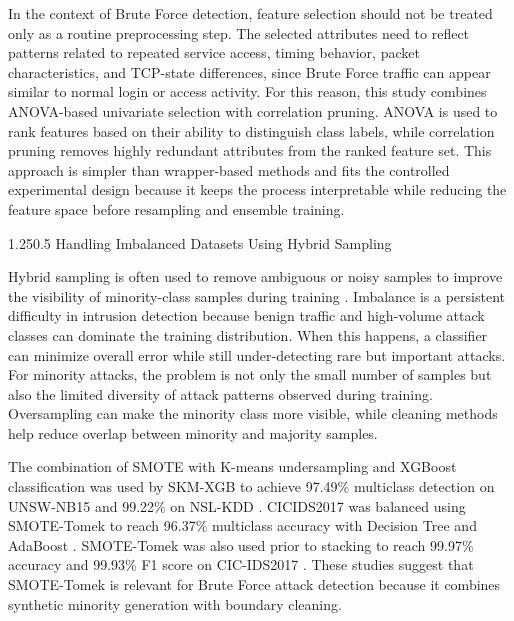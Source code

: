 \documentclass[12pt,a4paper]{article}
\makeatletter
\renewcommand{\subsection}{\@startsection{subsection}{2}{0pt}%
  {1.25\baselineskip}{0.5\baselineskip}%
  {\normalfont\fontsize{13}{15.6}\selectfont\bfseries}}
\makeatother
\begin{document}
In the context of Brute Force detection, feature selection should not be treated only as a routine preprocessing step. The selected attributes need to reflect patterns related to repeated service access, timing behavior, packet characteristics, and TCP-state differences, since Brute Force traffic can appear similar to normal login or access activity. For this reason, this study combines ANOVA-based univariate selection with correlation pruning. ANOVA is used to rank features based on their ability to distinguish class labels, while correlation pruning removes highly redundant attributes from the ranked feature set. This approach is simpler than wrapper-based methods and fits the controlled experimental design because it keeps the process interpretable while reducing the feature space before resampling and ensemble training.

\subsection{Handling Imbalanced Datasets Using Hybrid Sampling}

Hybrid sampling is often used to remove ambiguous or noisy samples to improve the visibility of minority-class samples during training \parencite{harini2023minority,prasad2025optimizing,yang2024imbalanced}. Imbalance is a persistent difficulty in intrusion detection because benign traffic and high-volume attack classes can dominate the training distribution. When this happens, a classifier can minimize overall error while still under-detecting rare but important attacks. For minority attacks, the problem is not only the small number of samples but also the limited diversity of attack patterns observed during training. Oversampling can make the minority class more visible, while cleaning methods help reduce overlap between minority and majority samples.

The combination of SMOTE with K-means undersampling and XGBoost classification was used by SKM-XGB to achieve 97.49\% multiclass detection on UNSW-NB15 and 99.22\% on NSL-KDD \parencite{hooshmand2024robust}. CICIDS2017 was balanced using SMOTE-Tomek to reach 96.37\% multiclass accuracy with Decision Tree and AdaBoost \parencite{khan2024balanced}. SMOTE-Tomek was also used prior to stacking to reach 99.97\% accuracy and 99.93\% F1 score on CIC-IDS2017 \parencite{nassreddine2025ensemble}. These studies suggest that SMOTE-Tomek is relevant for Brute Force attack detection because it combines synthetic minority generation with boundary cleaning. 
\end{document}

